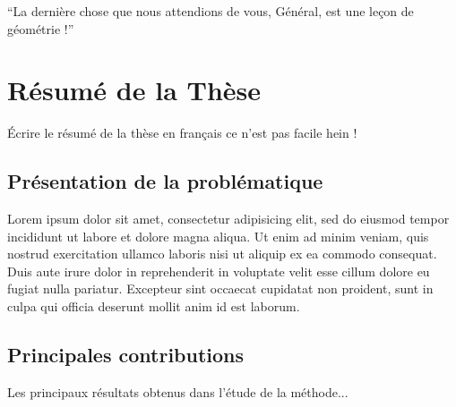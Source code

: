 \begin{savequote}[0.55\linewidth]
	``La dernière chose que nous attendions de vous, Général, est une leçon de géométrie !''
\end{savequote}


\chapter{Résumé de la Thèse}

Écrire le résumé de la thèse en français ce n'est pas facile hein !


\section{Présentation de la problématique}

Lorem ipsum dolor sit amet, consectetur adipisicing elit, sed do eiusmod
tempor incididunt ut labore et dolore magna aliqua. Ut enim ad minim veniam,
quis nostrud exercitation ullamco laboris nisi ut aliquip ex ea commodo
consequat. Duis aute irure dolor in reprehenderit in voluptate velit esse
cillum dolore eu fugiat nulla pariatur. Excepteur sint occaecat cupidatat non
proident, sunt in culpa qui officia deserunt mollit anim id est laborum.

\section{Principales contributions} 

Les principaux résultats obtenus dans l'étude de la méthode...



